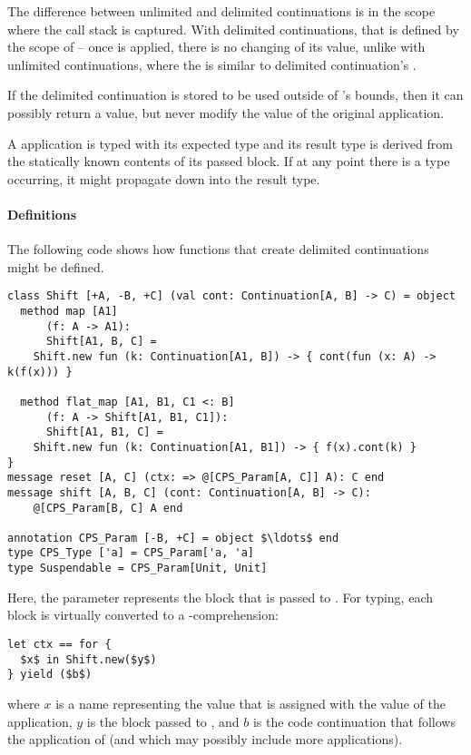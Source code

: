The difference between unlimited and delimited continuations is in the scope where the call stack is captured. With delimited continuations, that is defined by the scope of  -- once  is applied, there is no changing of its value, unlike with unlimited continuations, where the  is similar to delimited continuation's . 

If the delimited continuation is stored to be used outside of 's bounds, then it can possibly return a value, but never modify the value of the original  application.

A  application is typed with its expected type and its result type is derived from the statically known contents of its passed block. If at any point there is a  type occurring, it might propagate down into the result type. 

\paragraph{Definitions}
The following code shows how functions that create delimited continuations might be defined. 
\begin{lstlisting}
class Shift [+A, -B, +C] (val cont: Continuation[A, B] -> C) = object
  method map [A1] 
      (f: A -> A1): 
      Shift[A1, B, C] =
    Shift.new fun (k: Continuation[A1, B]) -> { cont(fun (x: A) -> k(f(x))) }

  method flat_map [A1, B1, C1 <: B] 
      (f: A -> Shift[A1, B1, C1]): 
      Shift[A1, B1, C] = 
    Shift.new fun (k: Continuation[A1, B1]) -> { f(x).cont(k) }
}
message reset [A, C] (ctx: => @[CPS_Param[A, C]] A): C end
message shift [A, B, C] (cont: Continuation[A, B] -> C): 
    @[CPS_Param[B, C] A end

annotation CPS_Param [-B, +C] = object $\ldots$ end
type CPS_Type ['a] = CPS_Param['a, 'a]
type Suspendable = CPS_Param[Unit, Unit]
\end{lstlisting}

Here, the  parameter represents the block that is passed to . For typing, each  block is virtually converted to a -comprehension:
\begin{lstlisting}
let ctx == for {
  $x$ in Shift.new($y$)
} yield ($b$)
\end{lstlisting}
where $x$ is a name representing the value that is assigned with the value of the  application, $y$ is the block passed to , and $b$ is the code continuation that follows the application of  (and which may possibly include more  applications). 

